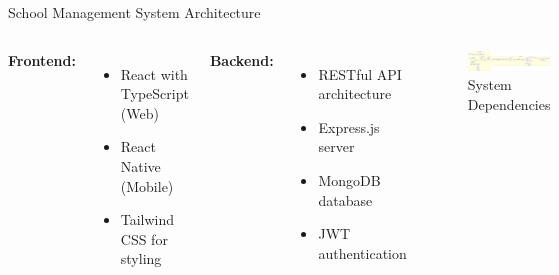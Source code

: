\documentclass[aspectratio=169]{beamer}
\begin{document}
\begin{frame}{School Management System Architecture}
    \begin{columns}
        \textbf{Frontend:}
        \begin{itemize}
            \item React with TypeScript (Web)
            \item React Native (Mobile)
            \item Tailwind CSS for styling
        \end{itemize}
        \textbf{Backend:}
        \begin{itemize}
            \item RESTful API architecture
            \item Express.js server
            \item MongoDB database
            \item JWT authentication
        \end{itemize}
        \begin{figure}
            \includegraphics[width=\textwidth,height=0.6\textheight,keepaspectratio]{../pfe-pics/diagrames/dependeces.png}
            \caption{System Dependencies}
        \end{figure}
    \end{columns}
\end{frame}
\end{document}
